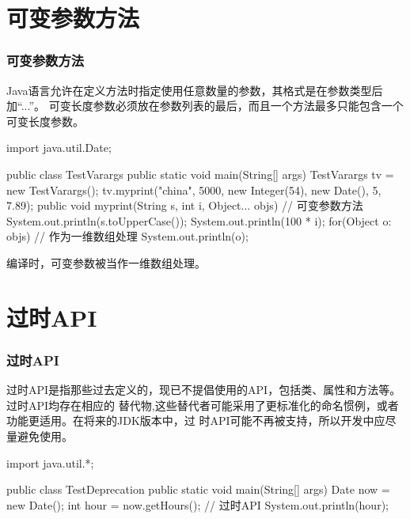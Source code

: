 \documentclass[compress,table]{beamer} %
\newcommand{\hei}{\CJKfamily{SimHei}}
\begin{document}
\section{可变参数方法}
\begin{frame}[fragile] %
\frametitle{可变参数方法}

Java语言允许在定义方法时指定使用任意数量的参数，其格式是在参数类型后加“...”。
可变长度参数必须放在参数列表的最后，而且一个方法最多只能包含一个可变长度参数。

\begin{javaCode}
import java.util.Date; 

public class TestVarargs {
  public static void main(String[] args) {
    TestVarargs tv = new TestVarargs();
    tv.myprint("china", 5000, new Integer(54), new Date(), 5, 7.89); 
  }
  public void myprint(String s, int i, Object... objs) { // 可变参数方法
    System.out.println(s.toUpperCase()); 
    System.out.println(100 * i);
    for(Object o: objs) { // 作为一维数组处理
      System.out.println(o); 
    }
  } 
}
\end{javaCode}

编译时，可变参数被当作{\hei 一维数组处理}。
\end{frame}

\section{过时API}
\begin{frame}[fragile] %
\frametitle{过时API}

过时API是指那些过去定义的，现已不提倡使用的API，包括类、属性和方法等。过时API均存在相应的
替代物,这些替代者可能采用了更标准化的命名惯例，或者功能更适用。在将来的JDK版本中，过
时API可能不再被支持，所以开发中应尽量避免使用。

\begin{javaCode}
import java.util.*;

public class TestDeprecation {
  public static void main(String[] args) {
    Date now = new Date();
    int hour = now.getHours(); // 过时API
    System.out.println(hour);
  } 
}
\end{javaCode}


\end{frame}
\end{document}

